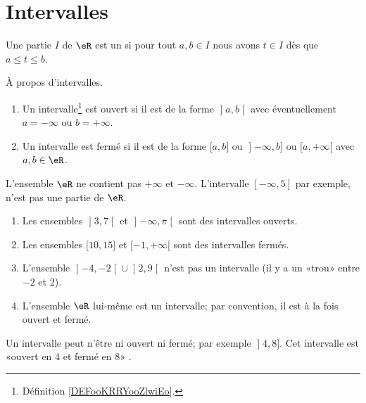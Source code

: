 
\section{Intervalles}

\begin{definition}[Intervalle]      \label{DEFooKRRYooZlwiEo}
	Une partie \( I\) de \( \eR\) est un  si pour tout \( a,b\in I\) nous avons \( t\in I\) dès que \( a\leq t\leq b\).
\end{definition}

\begin{proposition}     \label{PROPooJJRZooACUmWN}
	À propos d'intervalles.
	\begin{enumerate}
		\item
		      Un intervalle\footnote{Définition \ref{DEFooKRRYooZlwiEo}.} est ouvert si il est de la forme \( \mathopen] a , b \mathclose[\) avec éventuellement \( a=-\infty\) ou \( b=+\infty\).
		\item
		      Un intervalle est fermé si il est de la forme \( \mathopen[ a , b \mathclose]\) ou \( \mathopen] -\infty , b \mathclose]\) ou \( \mathopen[ a , +\infty [\) avec \( a,b\in \eR\).
	\end{enumerate}
\end{proposition}

\begin{remark}
	L'ensemble \( \eR\) ne contient pas \( +\infty\) et \( -\infty\). L'intervalle \( [-\infty, 5]\) par exemple, n'est pas une partie de \( \eR\).
\end{remark}

\begin{example}
	\begin{enumerate}
		\item
		      Les ensembles \( \mathopen] 3 , 7 \mathclose[\) et \( \mathopen] -\infty , \pi \mathclose[\) sont des intervalles ouverts.
		\item
		      Les ensembles \( \mathopen[ 10 , 15 \mathclose]\) et \( \mathopen[ -1 , +\infty [\) sont des intervalles fermés.
		\item
		      L'ensemble \( \mathopen] -4 , -2 \mathclose[\cup\mathopen] 2 , 9 \mathclose[\) n'est pas un intervalle (il y a un «trou» entre \(- 2\) et \( 2\)).
		\item
		      L'ensemble \( \eR\) lui-même est un intervalle; par convention, il est à la fois ouvert et fermé.
	\end{enumerate}
	Un intervalle peut n'être ni ouvert ni fermé; par exemple \( \mathopen] 4 , 8 \mathclose]\). Cet intervalle est «ouvert en \( 4\) et fermé en \( 8\)» .
\end{example}

